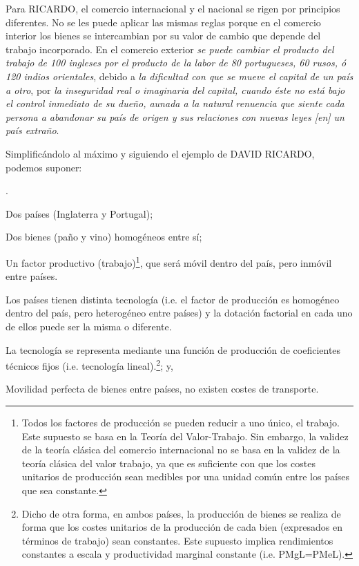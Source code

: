 \documentclass[10pt,a4paper]{article}
\newcounter{numitem}
\newenvironment{lnum}
      {\begin{list}{\arabic{numitem}.}{%
          \usecounter{numitem}%
          \setlength{\leftmargin}{1cm}%
          \setlength{\parskip}{3pt}%
          \setlength{\itemsep}{0pt}%
          \setlength{\parsep}{0pt}%
      }}
      {\end{list}}
\begin{document}
{    Para RICARDO, el comercio internacional y el nacional se rigen por principios diferentes. No se les puede aplicar las mismas reglas porque en el comercio interior los bienes se intercambian por su valor de cambio que depende del trabajo incorporado. En el comercio exterior \textit{se puede cambiar el producto del trabajo de 100 ingleses por el producto de la labor de 80 portugueses, 60 rusos, ó 120 indios orientales}, debido a \textit{la dificultad con que se mueve el capital de un país a otro}, por \textit{la inseguridad real o imaginaria del capital, cuando éste no está bajo el control inmediato de su dueño, aunada a la natural renuencia que siente cada persona a abandonar su país de origen y sus relaciones con nuevas leyes [en] un país extraño}.
}

Simplificándolo al máximo y siguiendo el ejemplo de DAVID RICARDO, podemos suponer:
\begin{lnum}
    \item Dos países (Inglaterra y Portugal);
    \item Dos bienes (paño y vino) homogéneos entre sí;
    \item Un factor productivo (trabajo)\footnote{%
        Todos los factores de producción se pueden reducir a uno único, el trabajo. Este supuesto se basa en la Teoría del Valor-Trabajo. Sin embargo, la validez de la teoría clásica del comercio internacional no se basa en la validez de la teoría clásica del valor trabajo, ya que es suficiente con que los costes unitarios de producción sean medibles por una unidad común entre los países que sea constante.
    }, que será móvil dentro del país, pero inmóvil entre países.
    \item Los países tienen distinta tecnología (i.e. el factor de producción es homogéneo dentro del país, pero heterogéneo entre países) y la dotación factorial en cada uno de ellos puede ser la misma o diferente.
    \item La tecnología se representa mediante una función de producción de coeficientes técnicos fijos (i.e. tecnología lineal).\footnote{%
        Dicho de otra forma, en ambos países, la producción de bienes se realiza de forma que los costes unitarios de la producción de cada bien (expresados en términos de trabajo) sean constantes. Este supuesto implica rendimientos constantes a escala y productividad marginal constante (i.e. PMgL=PMeL).
    }; y,
    \item Movilidad perfecta de bienes entre países, no existen costes de transporte.
\end{lnum}
\end{document}
